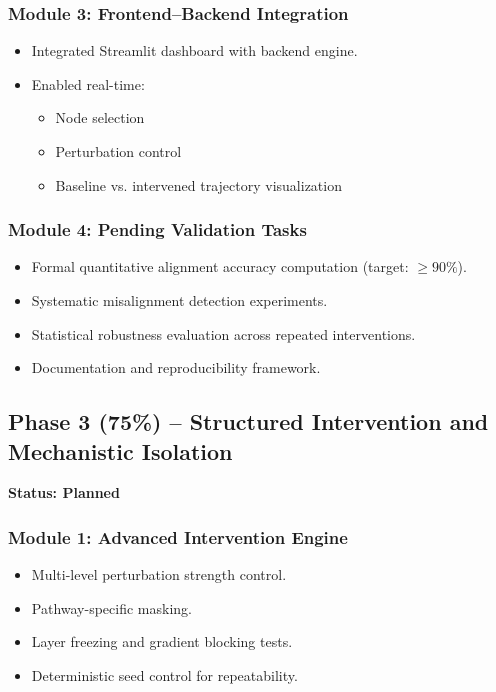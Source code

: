 \documentclass[12pt,singleside,a4paper]{article}
\begin{document}
\subsubsection*{Module 3: Frontend–Backend Integration}
\begin{itemize}
    \item Integrated Streamlit dashboard with backend engine.
    \item Enabled real-time:
    \begin{itemize}
        \item Node selection
        \item Perturbation control
        \item Baseline vs. intervened trajectory visualization
    \end{itemize}
\end{itemize}

\subsubsection*{Module 4: Pending Validation Tasks}
\begin{itemize}
    \item Formal quantitative alignment accuracy computation (target: $\geq 90\%$).
    \item Systematic misalignment detection experiments.
    \item Statistical robustness evaluation across repeated interventions.
    \item Documentation and reproducibility framework.
\end{itemize}

\vspace{0.5cm}

\subsection{Phase 3 (75\%) -- Structured Intervention and Mechanistic Isolation}
\textbf{Status: Planned}

\subsubsection*{Module 1: Advanced Intervention Engine}
\begin{itemize}
    \item Multi-level perturbation strength control.
    \item Pathway-specific masking.
    \item Layer freezing and gradient blocking tests.
    \item Deterministic seed control for repeatability.
\end{itemize}
\end{document}

